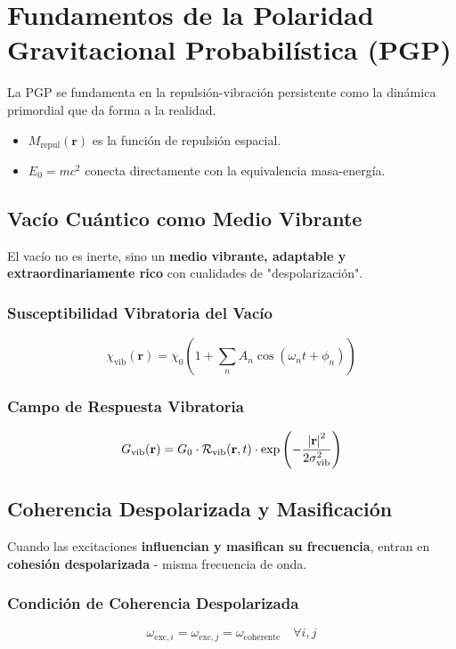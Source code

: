 \documentclass{book}
\begin{document}
\section{Fundamentos de la Polaridad Gravitacional Probabilística (PGP)}
La PGP se fundamenta en la repulsión-vibración persistente como la dinámica primordial que da forma a la realidad.
\begin{itemize}
    \item $M_{\text{repul}}(\mathbf{r})$ es la función de repulsión espacial.
    \item $E_0 = mc^2$ conecta directamente con la equivalencia masa-energía.
\end{itemize}

\subsection{Vacío Cuántico como Medio Vibrante}
El vacío no es inerte, sino un \textbf{medio vibrante, adaptable y extraordinariamente rico} con cualidades de "despolarización".

\subsubsection{Susceptibilidad Vibratoria del Vacío}
\begin{equation}
\chi_{\text{vib}}(\mathbf{r}) = \chi_0 \left(1 + \sum_n A_n \cos(\omega_n t + \phi_n)\right)
\end{equation}

\subsubsection{Campo de Respuesta Vibratoria}
\begin{equation}
G_{\text{vib}}(\mathbf{r}) = G_0 \cdot \mathcal{R}_{\text{vib}}(\mathbf{r},t) \cdot \exp\left(-\frac{\abs{\mathbf{r}}^2}{2\sigma_{\text{vib}}^2}\right)
\end{equation}

\subsection{Coherencia Despolarizada y Masificación}
Cuando las excitaciones \textbf{influencian y masifican su frecuencia}, entran en \textbf{cohesión despolarizada} - misma frecuencia de onda.

\subsubsection{Condición de Coherencia Despolarizada}
\begin{equation}
\omega_{\text{exc},i} = \omega_{\text{exc},j} = \omega_{\text{coherente}} \quad \forall i,j
\end{equation}
\end{document}
